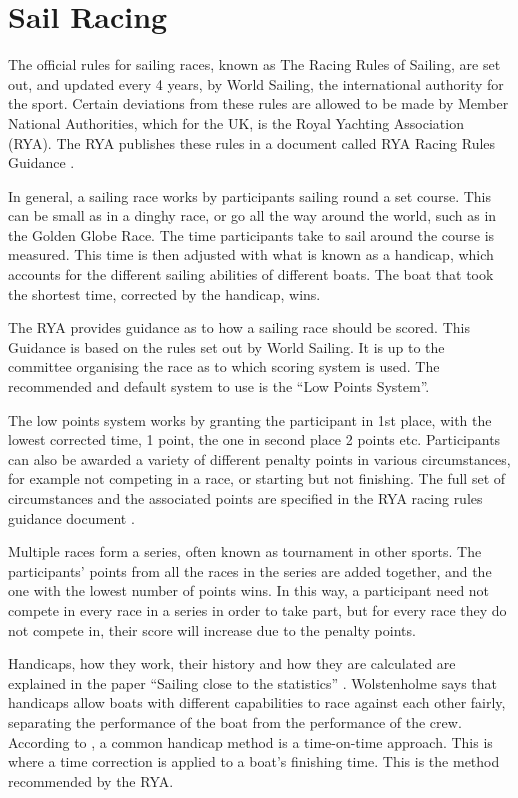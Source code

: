 \documentclass{l4proj}
\begin{document}
\section{Sail Racing}
The official rules for sailing races, known as The Racing Rules of Sailing, are set out, and updated every 4 years, by World Sailing, the international authority for the sport. Certain deviations from these rules are allowed to be made by Member National Authorities, which for the UK, is the Royal Yachting Association (RYA). The RYA publishes these rules in a document called RYA Racing Rules Guidance \citep{RYAscore}.

In general, a sailing race works by participants sailing round a set course. This can be small as in a dinghy race, or go all the way around the world, such as in the Golden Globe Race. The time participants take to sail around the course is measured. This time is then adjusted with what is known as a handicap, which accounts for the different sailing abilities of different boats. The boat that took the shortest time, corrected by the handicap, wins.

The RYA provides guidance as to how a sailing race should be scored. This Guidance is based on the rules set out by World Sailing. It is up to the committee organising the race as to which scoring system is used. The recommended and default system to use is the “Low Points System”.

The low points system works by granting the participant in 1st place, with the lowest corrected time, 1 point, the one in second place 2 points etc. Participants can also be awarded a variety of different penalty points in various circumstances, for example not competing in a race, or starting but not finishing. The full set of circumstances and the associated points are specified in the RYA racing rules guidance document \citet{RYAscore}.

Multiple races form a series, often known as tournament in other sports. The participants' points from all the races in the series are added together, and the one with the lowest number of points wins. In this way, a participant need not compete in every race in a series in order to take part, but for every race they do not compete in, their score will increase due to the penalty points.

Handicaps, how they work, their history and how they are calculated are explained in the paper “Sailing close to the statistics” \citep{hanicaps}. Wolstenholme says that handicaps allow boats with different capabilities to race against each other fairly, separating the performance of the boat from the performance of the crew. 
According to \citet{hanicaps}, a common handicap method is a time-on-time approach. This is where a time correction is applied to a boat’s finishing time. This is the method recommended by the RYA.
\end{document}
